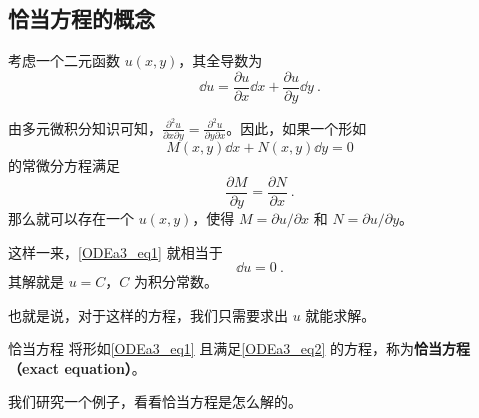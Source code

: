 

\subsection{恰当方程的概念}

考虑一个二元函数 $u(x, y)$，其全导数为
\begin{equation}
\dd u=\frac{\partial u}{\partial x}\dd x+\frac{\partial u}{\partial y}\dd y~.
\end{equation}

由多元微积分知识可知，$\frac{\partial^2 u}{\partial x\partial y}=\frac{\partial^2 u}{\partial y\partial x}$。因此，如果一个形如
\begin{equation}\label{ODEa3_eq1}
M(x, y)\dd x+N(x, y)\dd y=0
\end{equation}
的常微分方程满足
\begin{equation}\label{ODEa3_eq2}
\frac{\partial M}{\partial y}=\frac{\partial N}{\partial x}~.
\end{equation}
那么就可以存在一个 $u(x, y)$，使得 $M=\partial u/\partial x$ 和 $N=\partial u/\partial y$。

这样一来，\autoref{ODEa3_eq1} 就相当于
\begin{equation}
\dd u=0~.
\end{equation}
其解就是 $u=C$，$C$ 为积分常数。

也就是说，对于这样的方程，我们只需要求出 $u$ 就能求解。

\begin{definition}{恰当方程}
将形如\autoref{ODEa3_eq1} 且满足\autoref{ODEa3_eq2} 的方程，称为\textbf{恰当方程（exact equation）}。
\end{definition}

我们研究一个例子，看看恰当方程是怎么解的。

